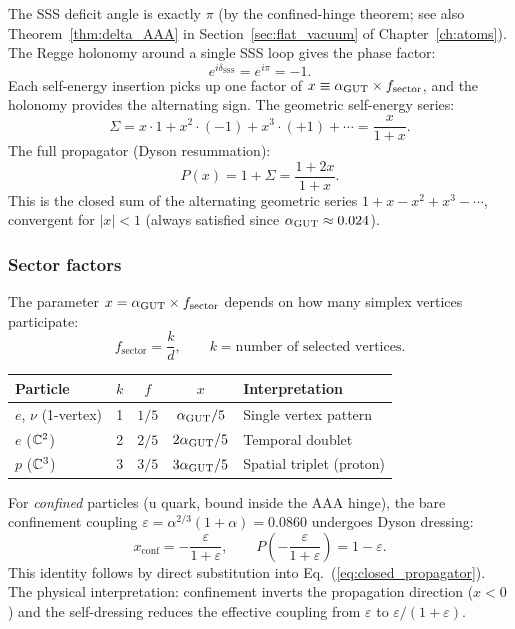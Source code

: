 The SSS deficit angle is exactly $\pi$ (by the confined-hinge theorem; see also Theorem~\ref{thm:delta_AAA} in Section~\ref{sec:flat_vacuum} of Chapter~\ref{ch:atoms}).  The Regge holonomy around a single SSS loop gives the phase factor:
\begin{equation}
e^{i\delta_\mathrm{SSS}} = e^{i\pi} = -1.
\end{equation}
Each self-energy insertion picks up one factor of $x \equiv \alpha_{\mathrm{GUT}} \times f_\mathrm{sector}$, and the holonomy provides the alternating sign.  The geometric self-energy series:
\begin{equation}
\Sigma = x \cdot 1 + x^2 \cdot (-1) + x^3 \cdot (+1) + \cdots = \frac{x}{1 + x}.
\end{equation}
The full propagator (Dyson resummation):
\begin{equation}
\label{eq:closed_propagator}
\boxed{P(x) = 1 + \Sigma = \frac{1 + 2x}{1 + x}.}
\end{equation}
This is the closed sum of the alternating geometric series $1 + x - x^2 + x^3 - \cdots$, convergent for $|x| < 1$ (always satisfied since $\alpha_{\mathrm{GUT}} \approx 0.024$).

\subsubsection{Sector factors}

The parameter $x = \alpha_{\mathrm{GUT}} \times f_\mathrm{sector}$ depends on how many simplex vertices participate:
\begin{equation}
f_\mathrm{sector} = \frac{k}{d}, \qquad k = \text{number of selected vertices.}
\end{equation}
\begin{center}
\begin{tabular}{lcccl}
\hline
Particle & $k$ & $f$ & $x$ & Interpretation \\
\hline
$e$, $\nu$ (1-vertex) & 1 & $1/5$ & $\alpha_{\mathrm{GUT}}/5$ & Single vertex pattern \\
$e$ ($\mathbb{C}^2$) & 2 & $2/5$ & $2\alpha_{\mathrm{GUT}}/5$ & Temporal doublet \\
$p$ ($\mathbb{C}^3$) & 3 & $3/5$ & $3\alpha_{\mathrm{GUT}}/5$ & Spatial triplet (proton) \\
\hline
\end{tabular}
\end{center}

For \emph{confined} particles (u quark, bound inside the AAA hinge), the bare confinement coupling $\varepsilon = \alpha^{2/3}(1+\alpha) = 0.0860$ undergoes Dyson dressing:
\begin{equation}
\label{eq:dyson_dressing}
x_\mathrm{conf} = -\frac{\varepsilon}{1+\varepsilon}, \qquad P\!\left(-\frac{\varepsilon}{1+\varepsilon}\right) = 1 - \varepsilon.
\end{equation}
This identity follows by direct substitution into Eq.~(\ref{eq:closed_propagator}).  The physical interpretation: confinement inverts the propagation direction ($x < 0$) and the self-dressing reduces the effective coupling from $\varepsilon$ to $\varepsilon/(1+\varepsilon)$.

